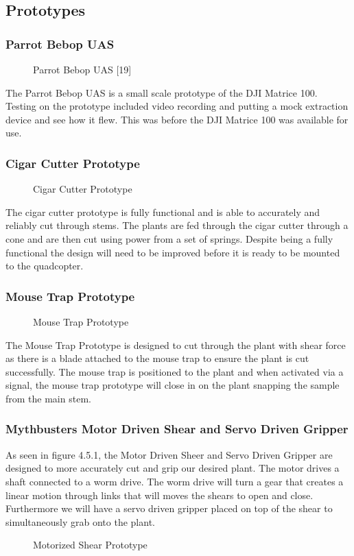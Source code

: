 \documentclass{wrcecapstone}
\begin{document}
\subsection{Prototypes}

\subsubsection{Parrot Bebop UAS}
\begin{figure}
\caption{Parrot Bebop UAS [19]}
\end{figure}
The Parrot Bebop UAS is a small scale prototype of the DJI Matrice 100. Testing on the prototype included video recording and putting a mock extraction device and see how it flew. This was before the DJI Matrice 100 was available for use. 

\subsubsection{Cigar Cutter Prototype}
\begin{figure}
\caption{Cigar Cutter Prototype}
\end{figure}
The cigar cutter prototype is fully functional and is able to accurately and reliably cut through stems. The plants are fed through the cigar cutter through a cone and are then cut using power from a set of springs.  Despite being a fully functional the design will need to be improved before it is ready to be mounted to the quadcopter.   

\subsubsection{Mouse Trap Prototype}
\begin{figure}
\caption{Mouse Trap Prototype}
\end{figure}
The Mouse Trap Prototype is designed to cut through the plant with shear force as there is a blade attached to the mouse trap to ensure the plant is cut successfully. The mouse trap is positioned to the plant and when activated via a signal, the mouse trap prototype will close in on the plant snapping the sample from the main stem. 

\subsubsection{Mythbusters Motor Driven Shear and Servo Driven Gripper}
As seen in figure 4.5.1, the Motor Driven Sheer and Servo Driven Gripper are designed to more accurately cut and grip our desired plant. The motor drives a shaft connected to a worm drive. The worm drive will turn a gear that creates a linear motion through links that will moves the shears to open and close. Furthermore we will have a servo driven gripper placed on top of the shear to simultaneously grab onto the plant.
\begin{figure}
\caption{Motorized Shear Prototype}
\end{figure}
\end{document}
